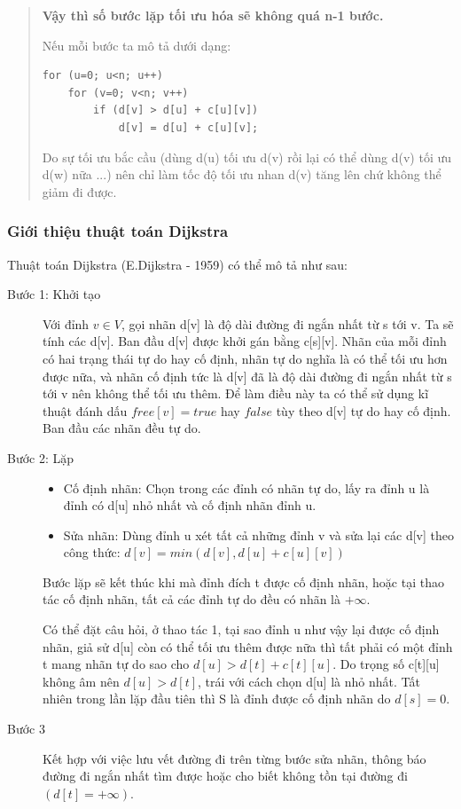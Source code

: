 \documentclass[a4paper,10pt]{article}
\begin{document}
\begin{quote}
\textbf{Vậy thì số bước lặp tối ưu hóa sẽ không quá n-1 bước.}

Nếu mỗi bước ta mô tả dưới dạng:
\begin{verbatim}
for (u=0; u<n; u++)
    for (v=0; v<n; v++)
        if (d[v] > d[u] + c[u][v])
            d[v] = d[u] + c[u][v];
\end{verbatim}
Do sự tối ưu bắc cầu (dùng d(u) tối ưu d(v) rồi lại có thể dùng d(v) tối ưu d(w) nữa ...) nên chỉ làm tốc độ tối ưu nhan d(v) tăng lên chứ không thể giảm đi được.

\end{quote}

\subsubsection{Giới thiệu thuật toán Dijkstra}
Thuật toán Dijkstra (E.Dijkstra - 1959) có thể mô tả như sau:
\begin{description}
\item[Bước 1: Khởi tạo ] Với đỉnh $v \in V$, gọi nhãn d[v] là độ dài đường đi ngắn nhất từ s tới v. Ta sẽ tính các d[v]. Ban đầu d[v] được khởi gán bằng c[s][v]. Nhãn của mỗi đỉnh có hai trạng thái tự do hay cố định, nhãn tự do nghĩa là có thể tối ưu hơn được nữa, và nhãn cố định tức là d[v] đã là độ dài đường đi ngắn nhất từ s tới v nên không thể tối ưu thêm. Để làm điều này ta có thể sử dụng kĩ thuật đánh dấu $free[v] = true$ hay $false$ tùy theo d[v] tự do hay cố định. Ban đầu các nhãn đều tự do.
\item[Bước 2: Lặp]

  \begin{itemize}
  \item Cố định nhãn: Chọn trong các đỉnh có nhãn tự do, lấy ra đỉnh u là đỉnh có d[u] nhỏ nhất và cố định nhãn đỉnh u.
  \item Sửa nhãn: Dùng đỉnh u xét tất cả những đỉnh v và sửa lại các d[v] theo công thức:
    $d[v] = min(d[v], d[u] + c[u][v])$
  \end{itemize}
Bước lặp sẽ kết thúc khi mà đỉnh đích t được cố định nhãn, hoặc tại thao tác cố định nhãn, tất cả các đỉnh tự do đều có nhãn là $+\infty$.

Có thể đặt câu hỏi, ở thao tác 1, tại sao đỉnh u như vậy lại được cố định nhãn, giả sử d[u] còn có thể tối ưu thêm được nữa thì tất phải có một đỉnh t mang nhãn tự do sao cho $d[u] > d[t] + c[t][u]$. Do trọng số c[t][u] không âm nên $d[u] > d[t]$, trái với cách chọn d[u] là nhỏ nhất. Tất nhiên trong lần lặp đầu tiên thì S là đỉnh được cố định nhãn do $d[s] = 0$.

\item[Bước 3] Kết hợp với việc lưu vết đường đi trên từng bước sửa nhãn, thông báo đường đi ngắn nhất tìm được hoặc cho biết không tồn tại đường đi $(d[t] = +\infty)$.
\end{description}
\end{document}
